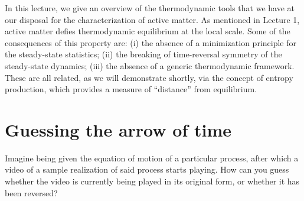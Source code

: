 
In this lecture, we give an overview of the thermodynamic tools that we have at our disposal for the characterization of active matter. 
As mentioned in Lecture 1, active matter defies thermodynamic equilibrium at the local scale. Some of the consequences of this property are: (i) the absence of a minimization principle for the steady-state statistics; (ii) the breaking of time-reversal symmetry of the steady-state dynamics; (iii) the absence of a generic thermodynamic framework. These are all related, as we will demonstrate shortly, via the concept of entropy production, which provides a measure of ``distance'' from equilibrium.


\section{Guessing the arrow of time}

Imagine being given the equation of motion of a particular process, after which a video of a sample realization of said process starts playing. How can you guess whether the video is currently being played in its original form, or whether it has been reversed?

